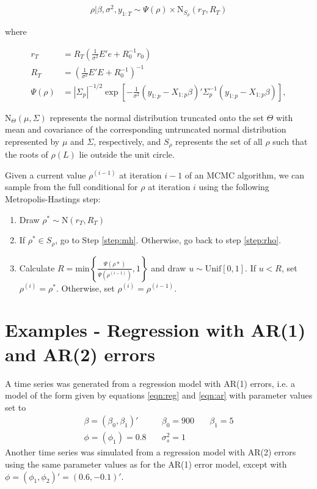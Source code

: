 \documentclass{article}
\begin{document}
\begin{equation}
\rho | \beta, \sigma^2, y_{1:T} \sim \Psi(\rho) \times \mbox{N}_{S_{\rho}}(r_T,R_T) \label{eqn:fullcondrho}
\end{equation}

\noindent where

\begin{align*}
r_T &= R_T(\frac{1}{\sigma^2}E'e + R_0^{-1}r_0) \\
R_T &= (\frac{1}{\sigma^2}E'E + R_0^{-1})^{-1} \\
\Psi(\rho) &= |\Sigma_p|^{-1/2} \exp\left[-\frac{1}{\sigma^2}(y_{1:p} - X_{1:p}\beta)'\Sigma_p^{-1}(y_{1:p} - X_{1:p}\beta)\right],
\end{align*}

\noindent $\mbox{N}_{\Theta}(\mu,\Sigma)$ represents the normal distribution truncated onto the set $\Theta$ with mean and covariance of the corresponding untruncated normal distribution represented by $\mu$ and $\Sigma$, respectively, and $S_{\rho}$ represents the set of all $\rho$ such that the roots of $\rho(L)$ lie outside the unit circle.

Given a current value $\rho^{(i-1)}$ at iteration $i-1$ of an MCMC algorithm, we can sample from the full conditional for $\rho$ at iteration $i$ using the following Metropolis-Hastings step:
\begin{enumerate}
\item Draw $\rho^* \sim \mbox{N}(r_T,R_T)$ \label{step:rho}
\item If $\rho^* \in S_{\rho}$, go to Step \ref{step:mh}. Otherwise, go back to step \ref{step:rho}.
\item Calculate $R = \mbox{min}\left\{\frac{\Psi(\rho*)}{\Psi(\rho^{(i-1)})}, 1\right\}$ and draw $u \sim \mbox{Unif}[0,1]$. If $u < R$, set $\rho^{(i)} = \rho^*$. Otherwise, set $\rho^{(i)} = \rho^{(i-1)}$. \label{step:mh}
\end{enumerate}

\section{Examples - Regression with AR(1) and AR(2) errors} \label{sec:ex}

A time series was generated from a regression model with AR(1) errors, i.e. a model of the form given by equations \eqref{eqn:reg} and \eqref{eqn:ar} with parameter values set to
\begin{align*}
\beta = (\beta_0,\beta_1)' &\quad \beta_0 = 900 &\quad \beta_1 = 5 \\
\phi = (\phi_1) = 0.8 &\quad \sigma_s^2 = 1
\end{align*}
Another time series was simulated from a regression model with AR(2) errors using the same parameter values as for the AR(1) error model, except with $\phi = (\phi_1,\phi_2)' = (0.6, -0.1)'$.
\end{document}
